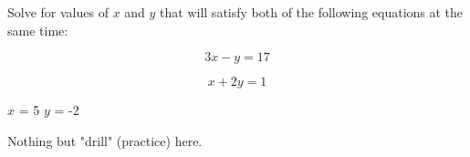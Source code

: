 

Solve for values of $x$ and $y$ that will satisfy both of the following equations at the same time:

$$3x - y = 17$$

$$x + 2y = 1$$







$x$ = 5 \hskip 50pt $y$ = -2







Nothing but "drill" (practice) here.




